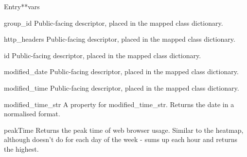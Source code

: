 \documentclass[letterpaper,10pt,english]{manual}
\begin{document}
\begin{classdesc}{Entry}{**vars}
\hypertarget{webscavator.model.models.Entry.group_id}{}\begin{memberdesc}{group\_id}
Public-facing descriptor, placed in the mapped class dictionary.
\end{memberdesc}

\hypertarget{webscavator.model.models.Entry.http_headers}{}\begin{memberdesc}{http\_headers}
Public-facing descriptor, placed in the mapped class dictionary.
\end{memberdesc}

\hypertarget{webscavator.model.models.Entry.id}{}\begin{memberdesc}{id}
Public-facing descriptor, placed in the mapped class dictionary.
\end{memberdesc}

\hypertarget{webscavator.model.models.Entry.modified_date}{}\begin{memberdesc}{modified\_date}
Public-facing descriptor, placed in the mapped class dictionary.
\end{memberdesc}

\hypertarget{webscavator.model.models.Entry.modified_time}{}\begin{memberdesc}{modified\_time}
Public-facing descriptor, placed in the mapped class dictionary.
\end{memberdesc}

\hypertarget{webscavator.model.models.Entry.modified_time_str}{}\begin{memberdesc}{modified\_time\_str}
A property for modified\_time\_str. Returns the date in a normalised format.
\end{memberdesc}

\hypertarget{webscavator.model.models.Entry.peakTime}{}\begin{staticmethoddesc}{peakTime}{}
Returns the peak time of web browser usage. Similar to the heatmap, although doesn't 
do for each day of the week - sums up each hour and returns the highest.
\end{staticmethoddesc}


\end{classdesc}
\end{document}
